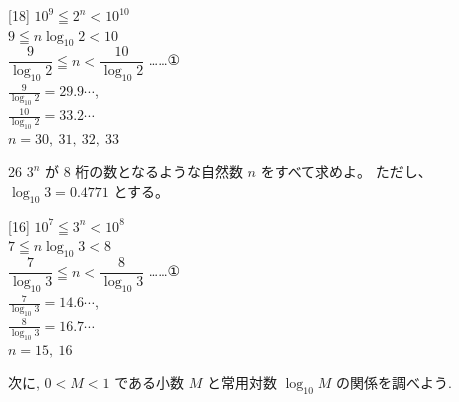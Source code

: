 \documentclass[14pt,dvipdfmx]{jsarticle}
\begin{document}
\vspace{1em}
\begin{answerbox}{}[18]
  $10^{9} \leqq 2^{n} < 10^{10}$\\
  $9 \leqq n\log_{10} 2 < 10$\\
  $\dfrac{9}{\log_{10} 2} \leqq n < \dfrac{10}{\log_{10} 2}$ \quad ……①\\
  \vspace{0.8em}
  $\frac{9}{\log_{10} 2}=29.9\cdots$,\\
  \vspace{0.8em}
  \makebox[17zw][l]{}$\frac{10}{\log_{10} 2}=33.2\cdots$\\
  \vspace{0.8em}
  $n=30,\ 31,\ 32,\ 33$
\end{answerbox}

\vfill
\nextpage


\vspace{-1.2zw}
\begin{practiceprob}{26}
  $3^{n}$ が $8$ 桁の数となるような自然数 $n$ をすべて求めよ。
  ただし、$\log_{10} 3 = 0.4771$ とする。
\end{practiceprob}

\begin{answerbox}{}[16]
  $10^{7} \leqq 3^{n} < 10^{8}$\\
  $7 \leqq n\log_{10} 3 < 8$\\
  $\dfrac{7}{\log_{10} 3} \leqq n < \dfrac{8}{\log_{10} 3}$ \quad ……①\\
  \vspace{0.45em}
  $\frac{7}{\log_{10} 3}=14.6\cdots$,\\
  \vspace{0.45em}
  \makebox[17zw][l]{}$\frac{8}{\log_{10} 3}=16.7\cdots$\\
  \vspace{0.45em}
  $n=15,\ 16$
\end{answerbox}

\vspace{2em}
次に, $0 < M < 1$ である小数 $M$ と常用対数 $\log_{10} M$ の関係を調べよう.
\end{document}
